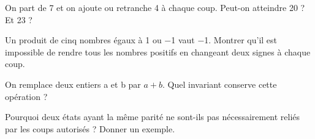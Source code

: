 \documentclass[11pt]{article}
\begin{document}
On part de 7 et on ajoute ou retranche 4 à chaque coup. Peut-on atteindre 20 ? Et 23 ?\par
\vspace{5pt}
Un produit de cinq nombres égaux à 1 ou −1 vaut −1. Montrer qu’il est impossible de rendre tous les nombres positifs en changeant deux signes à chaque coup.\par
\vspace{5pt}
On remplace deux entiers a et b par \(a + b\). Quel invariant conserve cette opération ?\par
\vspace{5pt}
Pourquoi deux états ayant la même parité ne sont-ils pas nécessairement reliés par les coups autorisés ? Donner un exemple.\par
\vspace{5pt}
\end{document}
